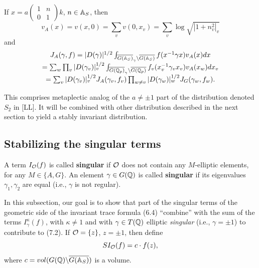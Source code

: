 If $x=a
\left(
\begin{array}{cc}
1&n\\
0&1
\end{array}
\right) k$, $n\in \mathbb{A} _S$, then
\begin{equation}
v_A(x)
=v(x,0)=\sum_v v(0,x_v)=
\sum_v \log\sqrt{|1+n_v^2|_v}
\end{equation}
and
\begin{equation}
\begin{array}{c}
J_A(\gamma,f)
=|D(\gamma)|^{1/2}
\int_{\overline{G(\mathbb{A} _S)}_\gamma
\backslash \overline{G(\mathbb{A} _S)}}
f(x^{-1}\gamma x)v_A(x)dx\\
=
\sum_w\prod_v
|D(\gamma_v)|_v^{1/2}
\int_{\overline{G(\mathbb{Q} _p)}_\gamma
\backslash \overline{G(\mathbb{Q} _p)}}
f_v(x_v^{-1}\gamma_v x_v)v_A(x_w)dx_v\\
=\sum_v |D(\gamma_v)|_v^{1/2} J_A(\gamma_v,f_v)
\prod_{w\not= v}|D(\gamma_w)|_w^{1/2} J_G(\gamma_w,f_w).
\end{array}
\end{equation}

\begin{remark} This comprises metaplectic analog of
the $a\not= \pm 1$
part of the distribution denoted $S_2$ in [LL]. It
will be combined with other distribution
described in the next section to yield a stably
invariant distribution.
\end{remark}

\subsection{Stabilizing the singular terms}

A term $I_{\cal{O}}(f)$ is called {\bf singular} if ${\cal{O}}$
does not contain any $M$-elliptic elements, for any $M\in \{A,G\}$.
An element $\gamma\in G(\mathbb{Q} )$ is called {\bf singular}
if its eigenvalues $\gamma_1,\gamma_2$ are equal (i.e.,
$\gamma$ is not regular).

In this subsection, our goal is to show that part of
the singular terms of the geometric side of the invariant
trace formula (6.4) ``combine'' with the sum of the terms
$I_\gamma ^\kappa (f)$,
with $\kappa \neq 1$ and with
$\gamma \in T(\mathbb{Q} )$ elliptic \emph{singular}
(i.e., $\gamma =\pm 1$) to contribute to (7.2). 
If ${\cal O}=\{z\}$, $z=\pm 1$, then define
\begin{equation}
SI_{\cal O}(f)=c\cdot f(z),
\end{equation}
where $c=vol(G({\mathbb Q})\backslash \overline{G(\mathbb{A} _S)})$ is a volume.


